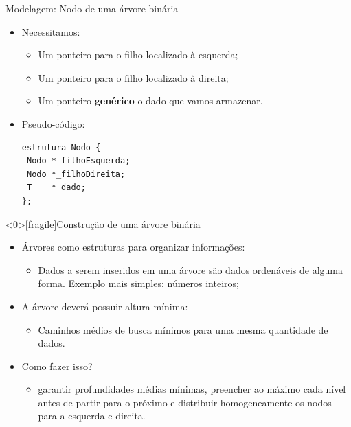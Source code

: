 \documentclass[12pt,table,xcolor={dvipsnames}]{beamer}
\begin{document}
\begin{frame}[fragile]{Modelagem: Nodo de uma árvore binária}
          \begin{itemize}
          \item Necessitamos:
          \begin{itemize}
          \item Um ponteiro para o filho localizado à esquerda;
          \item Um ponteiro para o filho localizado à direita;
          \item Um ponteiro \textbf{genérico} o dado que vamos armazenar.
          \end{itemize}
          \item Pseudo-código:
          \begin{lstlisting}
estrutura Nodo {
 Nodo *_filhoEsquerda;
 Nodo *_filhoDireita;
 T    *_dado;
};\end{lstlisting}
       	  \end{itemize}
\end{frame} 

\begin{frame}<0>[fragile]{Construção de uma árvore binária}
          \begin{itemize}
          \item Árvores como estruturas para organizar informações:
          \begin{itemize}
          \item Dados a serem inseridos em uma árvore são dados ordenáveis de alguma forma. Exemplo mais simples: números inteiros;
          \end{itemize}
          \item A árvore deverá possuir altura mínima:
          \begin{itemize}
          \item Caminhos médios de busca mínimos para uma mesma quantidade de dados.
          \end{itemize}
          \item Como fazer isso?
          \begin{itemize}
          \item garantir profundidades médias mínimas, preencher ao máximo cada nível antes de partir para o próximo e distribuir homogeneamente os nodos para a esquerda e direita.
          \end{itemize}
       	  \end{itemize}
\end{frame} 
\end{document}
